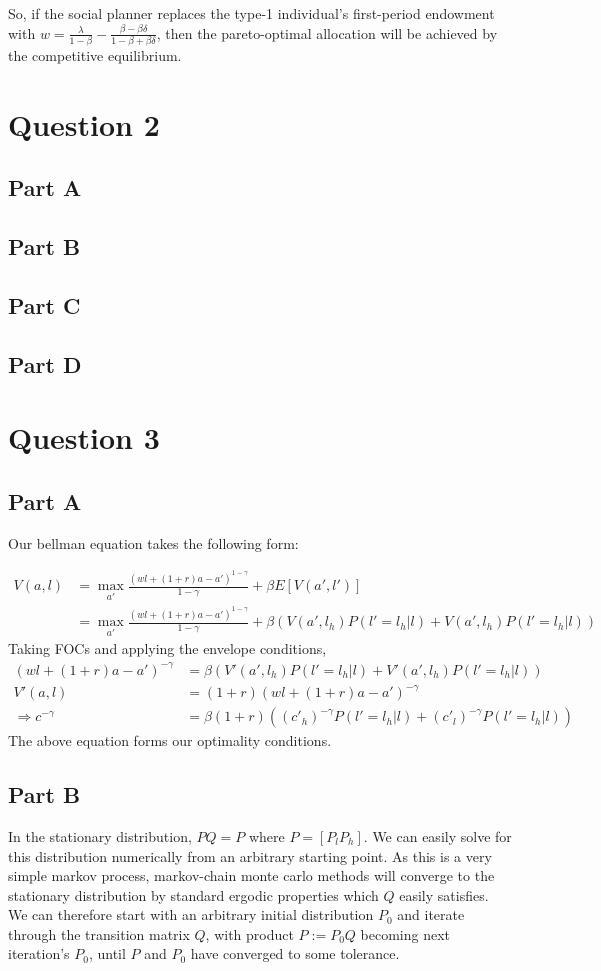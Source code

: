 \documentclass[11pt]{article} %
\begin{document}
So, if the social planner replaces the type-1 individual's first-period endowment with $w = \frac{\lambda}{1-\beta} -  \frac{\beta - \beta\delta}{1-\beta + \beta\delta}$, then the pareto-optimal allocation will be achieved by the competitive equilibrium.

\section{Question 2}
\subsection{Part A}
\subsection{Part B}
\subsection{Part C}
\subsection{Part D}
\section{Question 3}
\subsection{Part A}
Our bellman equation takes the following form:

\begin{align*}
V(a,l) &= \max_{a'} \frac{(wl +(1+r)a - a')^{1-\gamma}}{1-\gamma} + \beta E[V(a',l')]\\
&=  \max_{a'} \frac{(wl +(1+r)a - a')^{1-\gamma}}{1-\gamma} + \beta (V(a',l_h)P(l'=l_h|l) + V(a',l_h)P(l'=l_h|l))
\end{align*}
Taking FOCs and applying the envelope conditions,
\begin{align*}
(wl +(1+r)a - a')^{-\gamma} &= \beta(V'(a',l_h)P(l'=l_h|l) + V'(a',l_h)P(l'=l_h|l))\\
V'(a,l) &= (1+r)(wl +(1+r)a - a')^{-\gamma}\\
\Rightarrow c^{-\gamma} &= \beta(1+r)((c'_h)^{-\gamma}P(l'=l_h|l) + (c'_l)^{-\gamma}P(l'=l_h|l) )
\end{align*}
The above equation forms our optimality conditions.
\subsection{Part B}
In the stationary distribution, $PQ = P$ where $P = [P_l P_h]$. We can easily solve for this distribution numerically from an arbitrary starting point. As this is a very simple markov process, markov-chain monte carlo methods will converge to the stationary distribution by standard ergodic properties which $Q$ easily satisfies. We can therefore start with an arbitrary initial distribution $P_0$ and iterate through the transition matrix $Q$, with product $P:=P_0Q$ becoming next iteration's $P_0$, until $P$ and $P_0$ have converged to some tolerance. 
\end{document}
